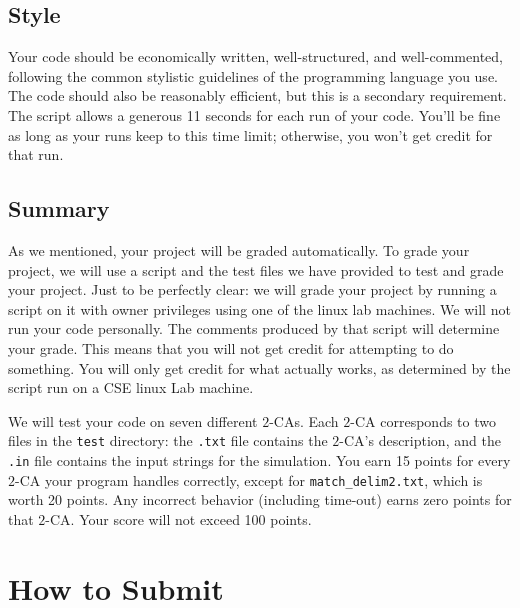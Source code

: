 \documentclass[11pt]{article}
\renewcommand{\t}[1]{\texttt{#1}}
\theoremstyle{definition}
\begin{document}
\subsection{Style}

Your code should be economically written, well-structured, and well-commented, following the common stylistic guidelines of the programming language you use.  The code should also be reasonably efficient, but this is a secondary requirement.  The script allows a generous 11 seconds for each run of your code.  You'll be fine as long as your runs keep to this time limit; otherwise, you won't get credit for that run.

\subsection{Summary}

As we mentioned, your project will be graded automatically.  To grade your project, we will use a script and the test files we have provided to test and grade your project.  Just to be perfectly clear: we will grade your project by running a script on it with owner privileges using one of the linux lab machines.  We will not run your code personally.  The comments produced by that script will determine your grade.  This means that you will not get credit for attempting to do something.  You will only get credit for what actually works, as determined by the script run on a CSE linux Lab machine.

We will test your code on seven different $2$-CAs.  Each $2$-CA corresponds to two files in the \t{test} directory: the \t{.txt} file contains the $2$-CA's description, and the \t{.in} file contains the input strings for the simulation.  You earn 15 points for every $2$-CA your program handles correctly, except for \t{match\_delim2.txt}, which is worth 20 points.  Any incorrect behavior (including time-out) earns zero points for that $2$-CA\@.  Your score will not exceed 100 points.

\section{How to Submit}
\end{document}
